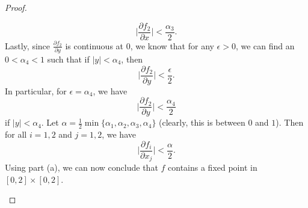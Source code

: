 \documentclass[a4paper]{article}
\begin{document}
\begin{proof}
\begin{enumerate}
        \[  \Big| \frac{\partial {f}_{2} }{\partial x }  \Big| < \frac{ {\alpha}_{3} }{ 2 }. \tag{3}  \]
        Lastly, since \( \frac{\partial {f}_{2} }{\partial y }  \) is continuous at \( 0 \), we know that for any \( \epsilon > 0  \), we can find an \( 0 < \alpha_{4} < 1  \) such that if \( | y  |  < {\alpha}_{4} \), then
        \[ \Big| \frac{\partial {f}_{2} }{\partial y }  \Big|  < \frac{\epsilon}{ 2 }.  \]
        In particular, for \( \epsilon = {\alpha}_{4} \), we have 
        \[  \Big| \frac{\partial {f}_{2} }{\partial y }  \Big|  < \frac{ {\alpha}_{4} }{ 2 } \tag{4}  \]
        if \( | y  |  < {\alpha}_{4} \). Let \( \alpha = \frac{ 1 }{ 2 } \min \{ {\alpha}_{1}, {\alpha}_{2}, {\alpha}_{3}, {\alpha}_{4} \}  \) (clearly, this is between \( 0 \) and \( 1  \)). Then for all \( i = 1,2 \) and \( j = 1,2 \), we have 
        \[  \Big| \frac{\partial {f}_{i} }{\partial {x}_{j} }  \Big| < \frac{ \alpha }{ 2 }.  \]
        Using part (a), we can now conclude that \( f  \) contains a fixed point in \( [0,2] \times [0,2] \).
\end{enumerate}
\end{proof}
\end{document}
